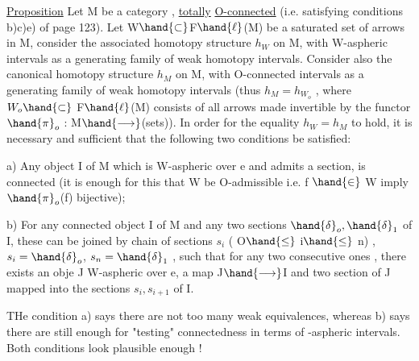 
\uline{Proposition} Let M be a category ,   \uline{totally}
\uline{O-connected} (i.e. satisfying conditions b)c)e) of page 123). Let W$\hand{\subset}$F$\hand{\ell}$(M)
be a saturated set of arrows in M, consider the associated homotopy
structure $h_W$ on M, with W-aspheric intervals as a generating family of
weak homotopy intervals. Consider also the canonical homotopy structure
 $h_M$ on M, with O-connected intervals as a generating family of weak
homotopy intervals (thus $h_M = h_{W_o}$ , where $W_o \hand{\subset}$ F$\hand{\ell}$(M) consists of all
arrows made invertible by the functor $\hand{\pi}_o$ : M$\hand{\longrightarrow}$(sets)). In order for the
equality $h_W = h_M$ to hold, it is necessary and sufficient that the
following two conditions be satisfied:

a) Any object  I of M which is W-aspheric over e and admits a
section, is connected (it is enough for this that W be O-admissible i.e.
f $\hand{\in}$ W imply $\hand{\pi}_o$(f) bijective);

b) For any connected object I of M and any two sections $\hand{\delta}_o,\hand{\delta}_1$ of I,
these can be joined by   chain of sections $s_i$ ( O$\hand{\leq}$ i$\hand{\leq}$ n) , $s_i = \hand{\delta}_o$,
$s_n = \hand{\delta}_1$ , such that for any two consecutive ones , there exists an obje
J  W-aspheric over e, a map J$\hand{\longrightarrow}$I and two section of J mapped
into the sections $s_i,s_{i+1}$ of I.

THe condition a) says there are not too many weak equivalences, 
whereas b) says there are still enough for "testing" connectedness in
terms of -aspheric intervals. Both conditions look plausible enough !

